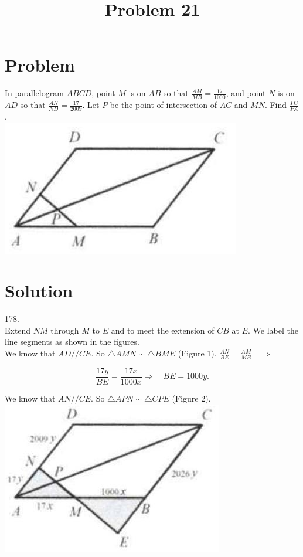 \documentclass{article}
\title{Problem 21}
\date{}
\begin{document}
\maketitle

\section*{Problem}
In parallelogram \(A B C D\), point \(M\) is on \(A B\) so that \(\frac{A M}{M B}=\frac{17}{1000}\), and point \(N\) is on \(A D\) so that \(\frac{A N}{N D}=\frac{17}{2009}\). Let \(P\) be the point of intersection of \(A C\) and \(M N\). Find \(\frac{P C}{P A}\).\\
\centering
\includegraphics[width=\textwidth]{images/130(1).jpg}

\section*{Solution}
178.\\
Extend \(N M\) through \(M\) to \(E\) and to meet the extension of \(C B\) at \(E\). We label the line segments as shown in the figures.\\
We know that \(A D / / C E\). So \(\triangle A M N \sim \triangle B M E\) (Figure 1). \(\frac{A N}{B E}=\frac{A M}{M B} \quad \Rightarrow\)

\[
\frac{17 y}{B E}=\frac{17 x}{1000 x} \Rightarrow \quad B E=1000 y .
\]

We know that \(A N / / C E\). So \(\triangle A P N \sim \triangle C P E\) (Figure 2).\\
\centering
\includegraphics[width=\textwidth]{images/142(3).jpg}
\end{document}
